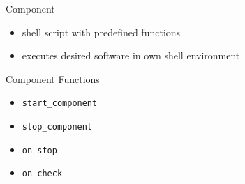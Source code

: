 \begin{frame}[fragile]{Component}
	\begin{itemize}
		\item shell script with predefined functions
		\item executes desired software in own shell environment %
	\end{itemize}
	
	\alert{Component Functions} %
	\begin{itemize}
		\item \texttt{start\_component}
		\item \texttt{stop\_component}
		\item \texttt{on\_stop}
		\item \texttt{on\_check}
	\end{itemize}
	
	
\end{frame}